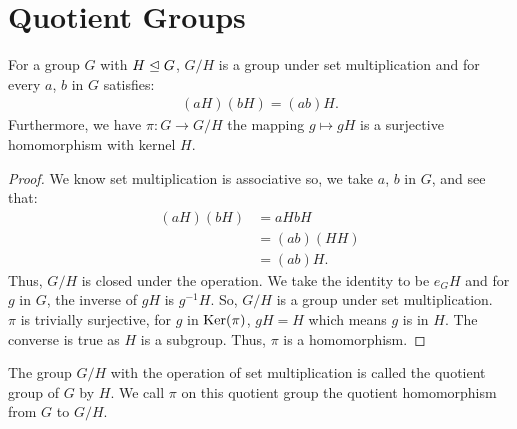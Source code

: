 \section{Quotient Groups}

For a group $G$ with $H \trianglelefteq G$, $G / H$ is a group under
set multiplication and for every $a$, $b$ in $G$ satisfies:
\begin{align*}
    (aH)(bH) = (ab)H.
\end{align*} Furthermore, we have $\pi : G \to G/H$ the
mapping $g \mapsto gH$ is a surjective homomorphism with
kernel $H$.

\begin{proof}
    We know set multiplication is associative so, we take 
    $a$, $b$ in $G$, and see that: \begin{align*}
        (aH)(bH) &= aHbH \\
        &= (ab)(HH) \tag{$H$ is normal} \\
        &= (ab)H. \tag{$H$ is a subgroup} 
    \end{align*} Thus, $G / H$ is closed under the operation.
    We take the identity to be $e_GH$ and for $g$ in $G$,
    the inverse of $gH$ is $g^{-1}H$. So, $G/H$ is a group
    under set multiplication.
    \\[\baselineskip]
    $\pi$ is trivially surjective, for $g$ in $\operatorname{Ker}(\pi)$,
    $gH = H$ which means $g$ is in $H$. The converse is
    true as $H$ is a subgroup. Thus, $\pi$ is a homomorphism.
\end{proof} The group $G / H$ with the operation of set
multiplication is called the quotient group of $G$ by $H$.
We call $\pi$ on this quotient group the quotient homomorphism
from $G$ to $G / H$.